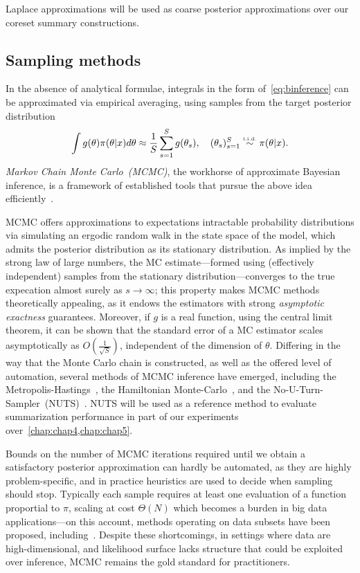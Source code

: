Laplace approximations will be used as coarse posterior approximations over our coreset summary constructions.

\subsection{Sampling methods}
\label{subsec:b-sampling-methods}
In the absence of analytical formulae, integrals in the form of~\cref{eq:binference} can be approximated via empirical averaging, using samples from the target posterior distribution
\[
 \int g(\theta) \pi(\theta|x) d\theta \approx \frac{1}{S} \sum_{s=1}^{S} g(\theta_s), \quad (\theta_s)_{s=1}^{S} \distiid \pi(\theta|x) .
\]
\emph{Markov Chain Monte Carlo~(MCMC)}, the workhorse of approximate Bayesian inference, is a framework of established tools that pursue the above idea efficiently~\citep{geyer92, gilks05, robert05}. 

MCMC offers approximations to expectations \wrt intractable probability distributions via simulating an ergodic random walk in the state space of the model, which admits the posterior distribution as its stationary distribution. As implied by the strong law of large numbers, the MC estimate---formed using (effectively independent) samples from the stationary distribution---converges to the true expecation almost surely as $s \rightarrow \infty$; this property makes MCMC methods theoretically appealing, as it endows the estimators with strong \emph{asymptotic exactness} guarantees. Moreover, if $g$ is a real function, using the central limit theorem, it can be shown that the standard error of a MC estimator scales asymptotically as $O(\frac{1}{\sqrt{S}})$, independent of the dimension of $\theta$. Differing in the way that the Monte Carlo chain is constructed, as well as the offered level of automation, several methods of MCMC inference have emerged, including the Metropolis-Hastings~\citep{andrieu03}, the Hamiltonian Monte-Carlo~\citep{neal11}, and the No-U-Turn-Sampler~(NUTS)~\citep{hoffman14}. NUTS will be used as a reference method to evaluate summarization performance in part of our experiments over~\cref{chap:chap4,chap:chap5}.

Bounds on the number of MCMC iterations required until we obtain a satisfactory posterior approximation can hardly be automated, as they are highly problem-specific, and in practice heuristics are used to decide when sampling should stop. Typically each sample requires at least one evaluation of a function proportial to $\pi$, scaling at cost $\Theta(N)$ which becomes a burden in big data applications---on this account, methods operating on data subsets have been proposed, including~\citep{welling11,korattikara14,bardenet14}. Despite these shortcomings, in settings where data are high-dimensional, and likelihood surface lacks structure that could be exploited over inference, MCMC remains the gold standard for practitioners.



